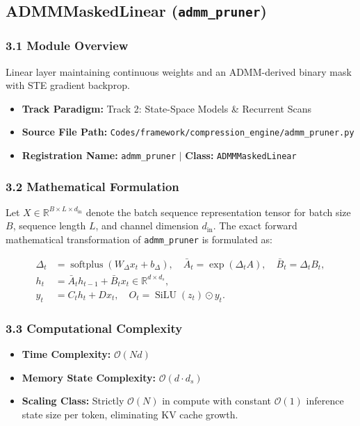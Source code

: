 \subsection{ADMMMaskedLinear (\texttt{admm\_pruner})}
\label{sec:app_module_admm_pruner}

\subsubsection*{3.1 Module Overview}
Linear layer maintaining continuous weights and an ADMM-derived binary mask with STE gradient backprop.
\begin{itemize}
    \item \textbf{Track Paradigm:} Track 2: State-Space Models & Recurrent Scans
    \item \textbf{Source File Path:} \texttt{Codes/framework/compression\_engine/admm\_pruner.py}
    \item \textbf{Registration Name:} \texttt{admm\_pruner} $\mid$ \textbf{Class:} \texttt{ADMMMaskedLinear}
\end{itemize}

\subsubsection*{3.2 Mathematical Formulation}
Let $X \in \mathbb{R}^{B \times L \times d_{\text{in}}}$ denote the batch sequence representation tensor for batch size $B$, sequence length $L$, and channel dimension $d_{\text{in}}$. The exact forward mathematical transformation of \texttt{admm\_pruner} is formulated as:

\begin{align}
\Delta_t &= \operatorname{softplus}(W_\Delta x_t + b_\Delta), \quad \bar{A}_t = \exp(\Delta_t A), \quad \bar{B}_t = \Delta_t B_t, \\
h_t &= \bar{A}_t h_{t-1} + \bar{B}_t x_t \in \mathbb{R}^{d \times d_s}, \\
y_t &= C_t h_t + D x_t, \quad O_t = \operatorname{SiLU}(z_t) \odot y_t.
\end{align}


\subsubsection*{3.3 Computational Complexity}
\begin{itemize}
    \item \textbf{Time Complexity:} $\mathcal{O}(N d)$
    \item \textbf{Memory State Complexity:} $\mathcal{O}(d \cdot d_s)$
    \item \textbf{Scaling Class:} Strictly $\mathcal{O}(N)$ in compute with constant $\mathcal{O}(1)$ inference state size per token, eliminating KV cache growth.
\end{itemize}

